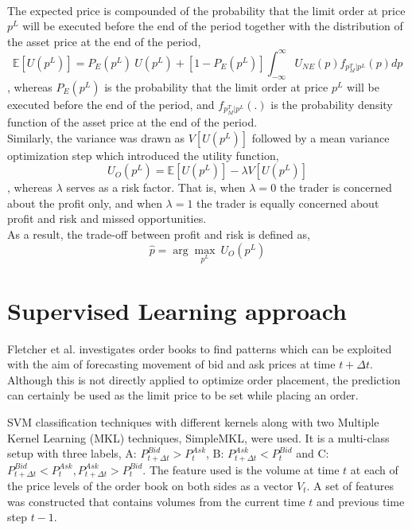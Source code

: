 \hfill
\\
The expected price is compounded of the probability that the limit order at price $p^L$ will be executed before the end of the period together with the distribution of the asset price at the end of the period,
\begin{equation}
    \mathbb{E}[U(p^L)] = P_E(p^L)\ U(p^L) + [1-P_E(p^L)] \int_{-\infty}^{\infty} U_{NE}(p) f_{p_M^T | p^L}(p) dp
\end{equation}
, whereas $P_E(p^L)$ is the probability that the limit order at price $p^L$ will be executed before the end of the period, and $f_{p_M^T | p^L}(.)$ is the probability density function of the asset price at the end of the period. 
\\
Similarly, the variance was drawn as $V[U(p^L)]$ followed by a mean variance optimization step which introduced the utility function,
\begin{equation}
    U_O(p^L) = \mathbb{E}[U(p^L)] - \lambda V[U(p^L)]
\end{equation}
, whereas $\lambda$ serves as a risk factor.
That is, when $\lambda=0$ the trader is concerned about the profit only, and when $\lambda=1$ the trader is equally concerned about profit and risk and missed opportunities.
\\
As a result, the trade-off between profit and risk is defined as,
\begin{equation}
    \hat{p} = \arg\max_{p^L}\ U_O(p^L)
\end{equation}


\section{Supervised Learning approach}

Fletcher et al. \cite{fletcher2010multiple} investigates order books to find patterns which can be exploited with the aim of forecasting movement of bid and ask prices at time $t+\Delta{t}$.
Although this is not directly applied to optimize order placement, the prediction can certainly be used as the limit price to be set while placing an order.

SVM classification techniques with different kernels along with two Multiple Kernel Learning (MKL) techniques, SimpleMKL, were used.
It is a multi-class setup with three labels, A: $P_{t+\Delta{t}}^{Bid} > P_t^{Ask}$, B: $P_{t+\Delta{t}}^{Ask} < P_t^{Bid}$ and C: $P_{t+\Delta{t}}^{Bid} < P_t^{Ask}, P_{t+\Delta{t}}^{Ask} > P_t^{Bid}$.
The feature used is the volume at time $t$ at each of the price levels of the order book on both sides as a vector $V_t$.
A set of features was constructed that contains volumes from the current time $t$ and previous time step $t-1$.

